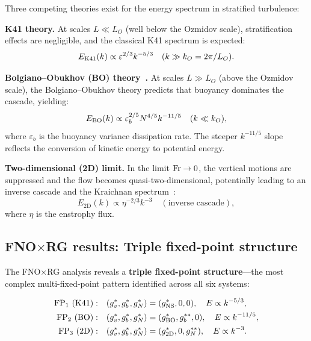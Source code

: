 Three competing theories exist for the energy spectrum in stratified turbulence:

\textbf{K41 theory.} At scales $L \ll L_O$ (well below the Ozmidov scale), stratification effects are negligible, and the classical K41 spectrum is expected:
\begin{equation}\label{eq:k41_strat}
E_{\text{K41}}(k) \propto \varepsilon^{2/3}k^{-5/3} \quad (k \gg k_O = 2\pi/L_O).
\end{equation}

\textbf{Bolgiano--Obukhov (BO) theory~\cite{bolgiano1959turbulent,obukhov1959influence}.} At scales $L \gg L_O$ (above the Ozmidov scale), the Bolgiano--Obukhov theory predicts that buoyancy dominates the cascade, yielding:
\begin{equation}\label{eq:bo_spectrum}
E_{\text{BO}}(k) \propto \varepsilon_b^{2/5}N^{4/5}k^{-11/5} \quad (k \ll k_O),
\end{equation}
where $\varepsilon_b$ is the buoyancy variance dissipation rate. The steeper $k^{-11/5}$ slope reflects the conversion of kinetic energy to potential energy.

\textbf{Two-dimensional (2D) limit.} In the limit $\mathrm{Fr} \to 0$, the vertical motions are suppressed and the flow becomes quasi-two-dimensional, potentially leading to an inverse cascade and the Kraichnan spectrum~\cite{kraichnan1967inertial}:
\begin{equation}\label{eq:2d_spectrum}
E_{\text{2D}}(k) \propto \eta^{-2/3}k^{-3} \quad (\text{inverse cascade}),
\end{equation}
where $\eta$ is the enstrophy flux.

\subsection{\texorpdfstring{FNO$\times$}{FNO x}RG results: Triple fixed-point structure}

The FNO$\times$RG analysis reveals a \textbf{triple fixed-point structure}---the most complex multi-fixed-point pattern identified across all six systems:

{\footnotesize
\begin{align}
 \text{FP}_1~(\text{K41}): &\quad (g_v^*, g_b^*, g_N^*) = (g_{\text{NS}}^*, 0, 0), \quad E \propto k^{-5/3}, \nonumber\\
\text{FP}_2~(\text{BO}): &\quad (g_v^*, g_b^*, g_N^*) = (g_{\text{BO}}^*, g_b^{**}, 0), \quad E \propto k^{-11/5}, \nonumber\\
\text{FP}_3~(\text{2D}): &\quad (g_v^*, g_b^*, g_N^*) = (g_{\text{2D}}^*, 0, g_N^{**}), \quad E \propto k^{-3}. \nonumber
\end{align}
}

